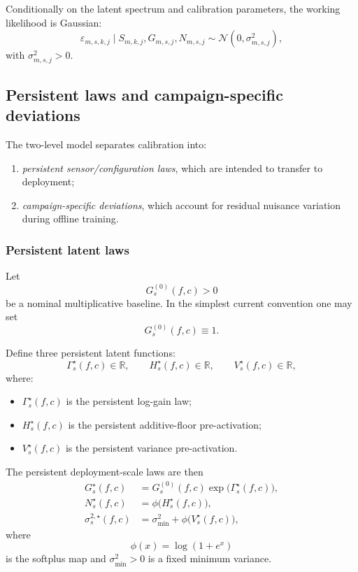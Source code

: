 Conditionally on the latent spectrum and calibration parameters, the working
likelihood is Gaussian:
\begin{equation}
\varepsilon_{m,s,k,j}
\mid
S_{m,k,j},G_{m,s,j},N_{m,s,j}
\sim
\mathcal N\!\left(0,\sigma^2_{m,s,j}\right),
\label{eq:offline-gaussian}
\end{equation}
with $\sigma^2_{m,s,j}>0$.

\subsection{Persistent laws and campaign-specific deviations}

The two-level model separates calibration into:

\begin{enumerate}
    \item \emph{persistent sensor/configuration laws}, which are intended to
    transfer to deployment;
    \item \emph{campaign-specific deviations}, which account for residual
    nuisance variation during offline training.
\end{enumerate}

\subsubsection{Persistent latent laws}

Let
\[
G_s^{(0)}(f,c) > 0
\]
be a nominal multiplicative baseline. In the simplest current convention one
may set
\[
G_s^{(0)}(f,c)\equiv 1.
\]

Define three persistent latent functions:
\[
\Gamma_s^\star(f,c)\in\mathbb R,
\qquad
H_s^\star(f,c)\in\mathbb R,
\qquad
V_s^\star(f,c)\in\mathbb R,
\]
where:

\begin{itemize}
    \item $\Gamma_s^\star(f,c)$ is the persistent log-gain law;
    \item $H_s^\star(f,c)$ is the persistent additive-floor pre-activation;
    \item $V_s^\star(f,c)$ is the persistent variance pre-activation.
\end{itemize}

The persistent deployment-scale laws are then
\begin{align}
G_s^\star(f,c)
&=
G_s^{(0)}(f,c)\exp\!\bigl(\Gamma_s^\star(f,c)\bigr),
\label{eq:persistent-gain}
\\
N_s^\star(f,c)
&=
\phi\!\bigl(H_s^\star(f,c)\bigr),
\label{eq:persistent-floor}
\\
\sigma_s^{2,\star}(f,c)
&=
\sigma_{\min}^2+\phi\!\bigl(V_s^\star(f,c)\bigr),
\label{eq:persistent-var}
\end{align}
where
\[
\phi(x)=\log(1+e^x)
\]
is the softplus map and $\sigma_{\min}^2>0$ is a fixed minimum variance.

